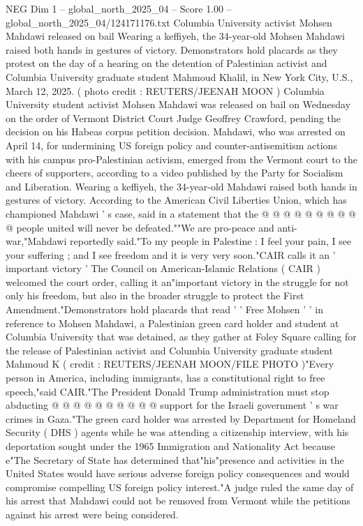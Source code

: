 \begin{textsample}{NEG Dim 1 – global\_north\_2025\_04 – Score 1.00 – global\_north\_2025\_04/124171176.txt}  \label{ex:f1_neg_107}
Columbia University activist Mohsen Mahdawi released on bail Wearing a keffiyeh, the 34-year-old Mohsen Mahdawi raised both hands in gestures of victory.
Demonstrators hold placards as they protest on the day of a hearing on the detention of Palestinian activist and Columbia University graduate student Mahmoud Khalil, in New York City, U.S., March 12, 2025. ( photo credit : REUTERS/JEENAH MOON ) Columbia University student activist Mohsen Mahdawi was released on bail on Wednesday on the order of Vermont District Court Judge Geoffrey Crawford, pending the decision on his Habeas corpus petition decision.
Mahdawi, who was arrested on April 14, for undermining US foreign policy and counter-antisemitism actions with his campus pro-Palestinian activism, emerged from the Vermont court to the cheers of supporters, according to a video published by the Party for Socialism and Liberation.
Wearing a keffiyeh, the 34-year-old Mahdawi raised both hands in gestures of victory.
According to the American Civil Liberties Union, which has championed Mahdawi ' s case, said in a statement that the @ @ @ @ @ @ @ @ @ @ people united will never be defeated.""We are pro-peace and anti-war,"Mahdawi reportedly said."To my people in Palestine : I feel your pain, I see your suffering ; and I see freedom and it is very very soon."CAIR calls it an ' important victory ' The Council on American-Islamic Relations ( CAIR ) welcomed the court order, calling it an"important victory in the struggle for not only his freedom, but also in the broader struggle to protect the First Amendment."Demonstrators hold placards that read ' ' Free Mohsen ' ' in reference to Mohsen Mahdawi, a Palestinian green card holder and student at Columbia University that was detained, as they gather at Foley Square calling for the release of Palestinian activist and Columbia University graduate student Mahmoud K ( credit : REUTERS/JEENAH MOON/FILE PHOTO )"Every person in America, including immigrants, has a constitutional right to free speech,"said CAIR."The President Donald Trump administration must stop abducting @ @ @ @ @ @ @ @ @ @ support for the Israeli government ' s war crimes in Gaza."The green card holder was arrested by Department for Homeland Security ( DHS ) agents while he was attending a citizenship interview, with his deportation sought under the 1965 Immigration and Nationality Act because e"The Secretary of State has determined that"his"presence and activities in the United States would have serious adverse foreign policy consequences and would compromise compelling US foreign policy interest."A judge ruled the same day of his arrest that Mahdawi could not be removed from Vermont while the petitions against his arrest were being considered.

\end{textsample}
